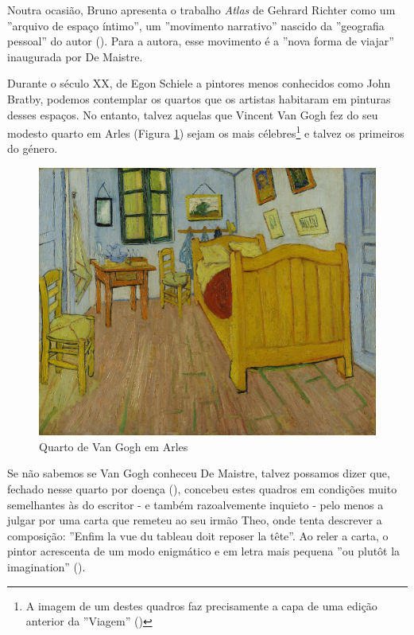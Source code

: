 \documentclass[12pt]{article}
\begin{document}
Noutra ocasião, Bruno apresenta o trabalho \emph{Atlas} de Gehrard
Richter como um ''arquivo de espaço íntimo'', um ''movimento
narrativo'' nascido da ''geografia pessoal'' do autor
(\cite[p.334]{bruno2002atlas}). Para a autora, esse movimento é a
''nova forma de viajar'' inaugurada por De Maistre.

Durante o século XX, de Egon Schiele a pintores menos conhecidos como
John Bratby, podemos contemplar os quartos que os artistas habitaram
em pinturas desses espaços. No entanto, talvez aquelas que Vincent Van
Gogh fez do seu modesto quarto em Arles (Figura \ref{fig:1}) sejam os
mais célebres\footnote{A imagem de um destes quadros faz precisamente
  a capa de uma edição anterior da ''Viagem'' (\cite{hedra})} e talvez
os primeiros do género.

\begin{figure}
  \centering\includegraphics[height=0.4\textheight,keepaspectratio] {slaapkamer.jpg}
  \caption{Quarto de Van Gogh em Arles}
  \label{fig:1}
\end{figure}

Se não sabemos se Van Gogh conheceu De Maistre, talvez possamos dizer
que, fechado nesse quarto por doença (\cite{goghroom}), concebeu estes
quadros em condições muito semelhantes às do escritor - e também
razoalvemente inquieto - pelo menos a julgar por uma carta que remeteu
ao seu irmão Theo, onde tenta descrever a composição: ''Enfim la vue
du tableau doit reposer la tête''. Ao reler a carta, o pintor
acrescenta de um modo enigmático e em letra mais pequena ''ou plutôt
la imagination'' (\cite{facsimile}).
\end{document}
